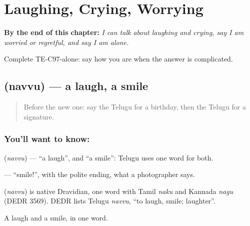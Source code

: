 
\chapter{Laughing, Crying, Worrying}
\label{ch:te-laughing-crying}

\begin{chapteropening}
\textbf{By the end of this chapter:} \emph{I can talk about laughing and crying, say I am worried or regretful, and say I am alone.}

Complete TE-C97-alone: say how you are when the answer is complicated.
\end{chapteropening}

\section[\texorpdfstring{\te{నవ్వు} (navvu)}{నవ్వు (navvu)}]{ (navvu) — a laugh, a smile}

\label{lesson:TE-C97-laugh}



\begin{quote}
Before the new one: say the Telugu for a birthday, then the Telugu for a signature.
\end{quote}

\subsection*{You'll want to know: }
\textbf{} (\emph{navvu}) — \textquotedblleft{}a laugh\textquotedblright{}, and \textquotedblleft{}a smile\textquotedblright{}: Telugu uses one word for both.

\textbf{} — \textquotedblleft{}smile!\textquotedblright{}, with the polite ending, what a photographer says.

\begin{cousinweb}
\textbf{} (\emph{navvu}) is native Dravidian, one word with Tamil \emph{naku} and Kannada \emph{nagu} (DEDR 3569). DEDR lists Telugu \emph{navvu}, \textquotedblleft{}to laugh, smile; laughter\textquotedblright{}.
\end{cousinweb}

\begin{grammarlens}[title={What you've built}]
A laugh and a smile, in one word.
\end{grammarlens}

